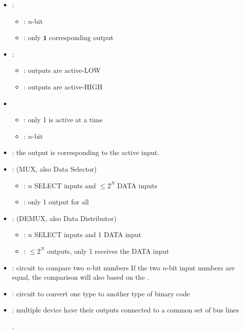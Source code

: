 \clearpage
\begin{multicols}{3}


    \begin{itemize}
      \item {}:
        \begin{itemize}
          \item {}: $n$-bit
          \item {}: only $\pmb{1}$ corresponding output
        \end{itemize}
      \item {}:
        \begin{itemize}
          \item {}: outputs are active-LOW
          \item {}: outputs are active-HIGH
        \end{itemize}
      \item {}
        \begin{itemize}
          \item {}: only 1 is active at a time
          \item {}: $n$-bit
        \end{itemize}
      \item {}: the output is corresponding to the
         active input.
      \item {}: (MUX, also Data Selector)
        \begin{itemize}
          \item {}: $n$ SELECT inputs and $\leq 2^{N}$ DATA inputs
          \item {}: only 1 output for all
        \end{itemize}
      \item {}: (DEMUX, also Data Distributor)
        \begin{itemize}
          \item {}: $n$ SELECT inputs and 1 DATA input
          \item {}: $\leq 2^{N}$ outputs, only 1 receives the DATA input
        \end{itemize}
      \item {}: circuit to compare two $n$-bit numbers
        If the two $n$-bit input numbers are equal, the comparison will also
        based on the .
        \par {}
      \item {}: circuit to convert one type to another type
        of binary code
      \item {}: multiple device have their outputs connected to
        a common set of bus lines
        \par {}.
  \end{itemize}

\end{multicols}